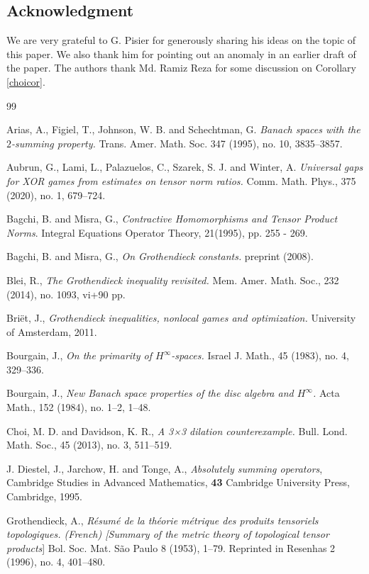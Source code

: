 \documentclass[a4paper,oneside,11pt, reqno]{amsart}
\numberwithin{equation}{section}
\theoremstyle{plain}
\begin{document}
\subsection*{Acknowledgment} We are very grateful to G. Pisier for generously sharing his ideas on the topic of this paper. We also thank him for pointing out an anomaly in an earlier draft of the paper. The authors thank Md. Ramiz Reza for some discussion on Corollary \ref{choicor}. 
\begin{thebibliography}{99}

 Arias, A., Figiel, T., Johnson, W. B. and Schechtman, G. \emph{Banach spaces with the $2$-summing property.} Trans. Amer. Math. Soc. 347 (1995), no. 10, 3835–3857. 

 Aubrun, G., Lami, L., Palazuelos, C., Szarek, S. J. and Winter, A. \emph{Universal gaps for XOR games from estimates on tensor norm ratios.} Comm. Math. Phys., 375 (2020), no. 1, 679–724.

  Bagchi, B. and Misra, G., \emph{Contractive
 Homomorphisms and Tensor Product Norms}. {Integral Equations
 Operator Theory}, 21(1995), pp. 255 - 269.

 Bagchi, B. and Misra, G., \emph{On Grothendieck constants.} preprint (2008).

  Blei, R., \emph{The Grothendieck inequality revisited.} Mem. Amer. Math. Soc., 232 (2014), no. 1093, vi+90 pp.


  Briët, J., \emph{Grothendieck inequalities, nonlocal games and optimization.} University of Amsterdam, 2011.

 Bourgain, J.,
\emph{On the primarity of $H^\infty$-spaces.}
Israel J. Math., 45 (1983), no. 4, 329--336.

 Bourgain, J., \emph{New Banach space properties of the disc algebra and $H^\infty$.} Acta Math., 152 (1984), no. 1--2, 1--48.



  Choi, M. D. and Davidson, K. R., \emph{A 3×3 dilation counterexample.} Bull. Lond. Math. Soc., 45 (2013), no. 3, 511–519. 

 J. Diestel, J., Jarchow, H.  and Tonge, A., \textit{
Absolutely summing operators}, 
Cambridge Studies in Advanced Mathematics, {\bf 43} Cambridge University Press, Cambridge, 1995. 
 
 Grothendieck, A., \emph{Résumé de la théorie métrique des produits tensoriels topologiques. (French) [Summary of the metric theory of topological tensor products}] Bol. Soc. Mat. São Paulo 8 (1953), 1–79. Reprinted in Resenhas 2 (1996), no. 4, 401–480.


\end{thebibliography}
\end{document}
